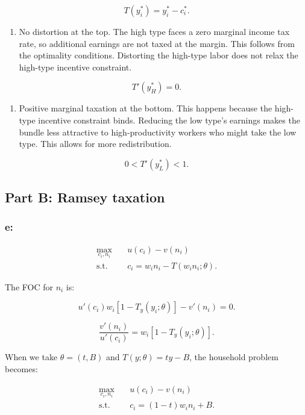 \documentclass[
  letterpaper,
  DIV=11,
  numbers=noendperiod]{scrartcl}
\providecommand{\tightlist}{%
  \setlength{\itemsep}{0pt}\setlength{\parskip}{0pt}}
\begin{document}
\[
T(y_i^*)=y_i^*-c_i^*.
\]

\begin{enumerate}
\def\labelenumi{\arabic{enumi}.}
\setcounter{enumi}{1}
\tightlist
\item
  No distortion at the top. The high type faces a zero marginal income
  tax rate, so additional earnings are not taxed at the margin. This
  follows from the optimality conditions. Distorting the high-type labor
  does not relax the high-type incentive constraint.
\end{enumerate}

\[
\boxed{T'(y_H^*)=0.}
\]

\begin{enumerate}
\def\labelenumi{\arabic{enumi}.}
\setcounter{enumi}{2}
\tightlist
\item
  Positive marginal taxation at the bottom. This happens because the
  high-type incentive constraint binds. Reducing the low type's earnings
  makes the bundle less attractive to high-productivity workers who
  might take the low type. This allows for more redistribution.
\end{enumerate}

\[
\boxed{0<T'(y_L^*)<1.}
\]

\subsection{Part B: Ramsey taxation}\label{part-b-ramsey-taxation}

\subsubsection{e:}\label{e}

\[
\begin{aligned}
\max_{c_i,n_i}\quad
&u(c_i)-v(n_i)\\
\text{s.t.}\quad
&c_i=w_i n_i-T(w_i n_i;\theta).
\end{aligned}
\]

The FOC for \(n_i\) is:

\[
u'(c_i)w_i[1-T_y(y_i;\theta)]-v'(n_i)=0.
\]

\[
\frac{v'(n_i)}{u'(c_i)}
=w_i[1-T_y(y_i;\theta)].
\]

When we take \(\theta=(t,B)\) and \(T(y;\theta)=ty-B\), the household
problem becomes:

\[
\begin{aligned}
\max_{c_i,n_i}\quad
&u(c_i)-v(n_i)\\
\text{s.t.}\quad
&c_i=(1-t)w_i n_i+B.
\end{aligned}
\]
\end{document}
